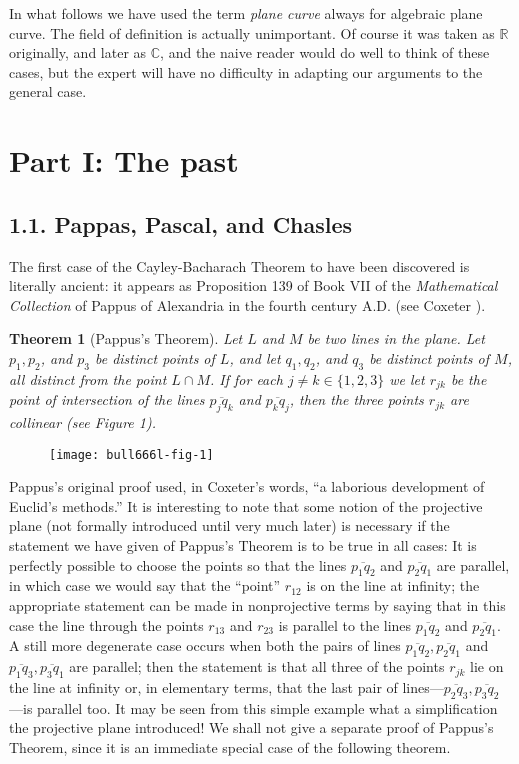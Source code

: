 \documentclass{bull-l}
\theoremstyle{pplain}
\newtheorem{thmcb}{Theorem}
\theoremstyle{definition}
\begin{document}
In what follows we have used the term \emph{plane curve} always for algebraic
plane curve.  The field of definition is actually unimportant.  Of course it
was taken as $\mathbb{R}$ originally, and later as $\mathbb{C}$, and the naive
reader would do well to think of these cases, but the expert will have no
difficulty in adapting our arguments to the general case.

\section*{Part I: The past} 
\subsection*{{\rm 1.1.} Pappas, Pascal, and Chasles}
The first case of the Cayley-Bacharach Theorem to have been discovered is
literally ancient: it appears as Proposition 139 of Book VII of the
\emph{Mathematical Collection} of Pappus of Alexandria in the fourth century
A.D. (see Coxeter \cite{Co}).

\begin{thmcb}[Pappus's Theorem] \label{thmcb1}
Let $L$ and $M$ be two lines in the plane.  Let $p_1,p_2$, and $p_3$ be
distinct points of $L$, and let $q_1,q_2$, and $q_3$ be distinct points of $M$,
all distinct from the point $L\cap M$.  If for each $j\ne k\in\{1,2,3\}$ we let
$r_{jk}$ be the point of intersection of the lines $\overline{p_jq_k}$ and $
\overline{p_kq_j}$, then the three points $r_{jk} $ are collinear \textup{(}see
Figure \textup{1)}.
\end{thmcb}

\begin{figure}
\texttt{[image: bull666l-fig-1]}\label{fig:one}
\caption{}
\end{figure}

Pappus's original proof used, in Coxeter's words, ``a laborious development of
Euclid's methods.''  It is interesting to note that some notion of the
projective plane (not formally introduced until very much later) is necessary if
the statement we have given of Pappus's Theorem is to be true in all cases: It
is perfectly possible to choose the points so that the lines
$\overline{p_1q_2}$ and $\overline{p_2q_1}$ are parallel, in which case we
would say that the ``point'' $r_{12}$ is on the line at infinity; the
appropriate statement can be made in nonprojective terms by saying that in this
case the line through the points $r_{13}$ and $r_{23}$ is parallel to the lines
$\overline{p_1q_2}$ and $\overline{p_2q_1} $.  A still more degenerate case
occurs when both the pairs of lines $\overline{p_1q_2}, \overline{p_2q_1}$ and
$\overline{p_1q_3},\overline{p_3q_1}$ are parallel; then the statement is that
all three of the points $r_{jk}$ lie on the line at infinity or, in elementary
terms, that the last pair of lines---$\overline{p_2q_3},
\overline{p_3q_2}$---is parallel too.  It may be seen from this simple example
what a simplification the projective plane introduced!  We shall not give a
separate proof of Pappus's Theorem, since it is an immediate special case of
the following theorem.
\end{document}
